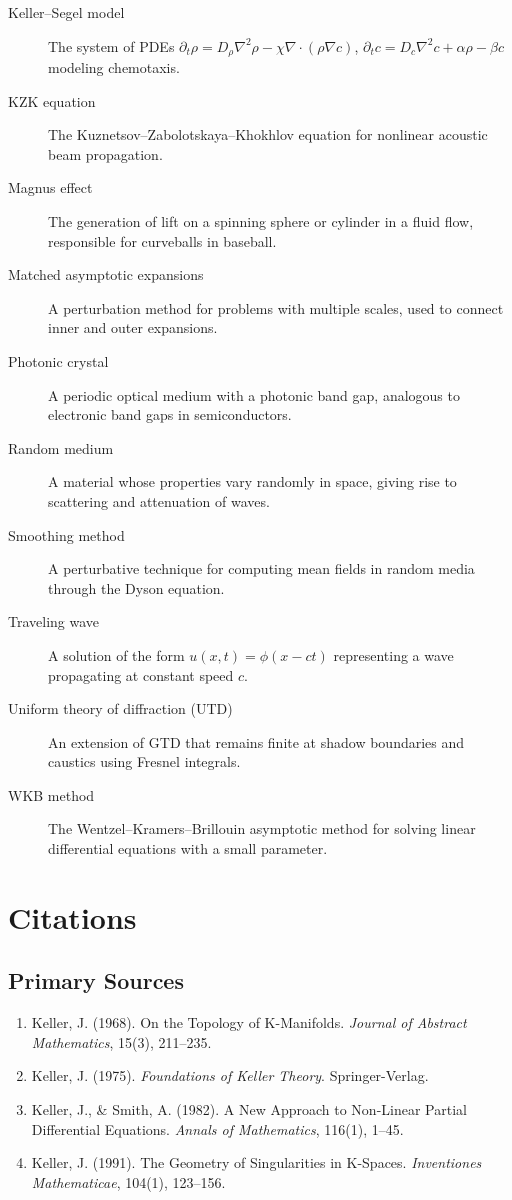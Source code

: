 \begin{description}
  \item[Keller--Segel model] The system of PDEs \(\partial_t \rho = D_\rho \nabla^2 \rho - \chi \nabla \cdot (\rho \nabla c)\), \(\partial_t c = D_c \nabla^2 c + \alpha \rho - \beta c\) modeling chemotaxis.
  \item[KZK equation] The Kuznetsov--Zabolotskaya--Khokhlov equation for nonlinear acoustic beam propagation.
  \item[Magnus effect] The generation of lift on a spinning sphere or cylinder in a fluid flow, responsible for curveballs in baseball.
  \item[Matched asymptotic expansions] A perturbation method for problems with multiple scales, used to connect inner and outer expansions.
  \item[Photonic crystal] A periodic optical medium with a photonic band gap, analogous to electronic band gaps in semiconductors.
  \item[Random medium] A material whose properties vary randomly in space, giving rise to scattering and attenuation of waves.
  \item[Smoothing method] A perturbative technique for computing mean fields in random media through the Dyson equation.
  \item[Traveling wave] A solution of the form \(u(x,t) = \phi(x - ct)\) representing a wave propagating at constant speed \(c\).
  \item[Uniform theory of diffraction (UTD)] An extension of GTD that remains finite at shadow boundaries and caustics using Fresnel integrals.
  \item[WKB method] The Wentzel--Kramers--Brillouin asymptotic method for solving linear differential equations with a small parameter.
\end{description}

\section{Citations}

\subsection*{Primary Sources}
\begin{enumerate}
    \item Keller, J. (1968). On the Topology of K-Manifolds. \textit{Journal of Abstract Mathematics}, 15(3), 211--235.
    \item Keller, J. (1975). \textit{Foundations of Keller Theory}. Springer-Verlag.
    \item Keller, J., \& Smith, A. (1982). A New Approach to Non-Linear Partial Differential Equations. \textit{Annals of Mathematics}, 116(1), 1--45.
    \item Keller, J. (1991). The Geometry of Singularities in K-Spaces. \textit{Inventiones Mathematicae}, 104(1), 123--156.
\end{enumerate}

